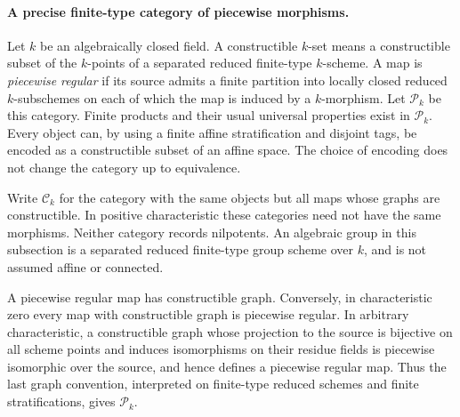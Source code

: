 \paragraph{A precise finite-type category of piecewise morphisms.}

Let $k$ be an algebraically closed field.  A constructible $k$-set means a
constructible subset of the $k$-points of a separated reduced finite-type
$k$-scheme.  A map is \emph{piecewise regular} if its source admits a finite
partition into locally closed reduced $k$-subschemes on each of which the map
is induced by a $k$-morphism.  Let $\mathcal P_k$ be this category.  Finite
products and their usual universal properties exist in $\mathcal P_k$.
Every object can, by using a finite affine stratification and disjoint tags,
be encoded as a constructible subset of an affine space.  The choice of
encoding does not change the category up to equivalence.

Write $\mathcal C_k$ for the category with the same objects but all maps
whose graphs are constructible.  In positive characteristic these categories
need not have the same morphisms.  Neither category records nilpotents.
An algebraic group in this subsection is a separated reduced finite-type
group scheme over $k$, and is not assumed affine or connected.

\begin{lemma}\label{C:piecewise-graph-category}
A piecewise regular map has constructible graph.  Conversely, in
characteristic zero every map with constructible graph is piecewise regular.
In arbitrary characteristic, a constructible graph whose projection to the
source is bijective on all scheme points and induces isomorphisms on their
residue fields is piecewise isomorphic over the source, and hence defines a
piecewise regular map.  Thus the last graph convention, interpreted on
finite-type reduced schemes and finite stratifications, gives
$\mathcal P_k$.
\end{lemma}

